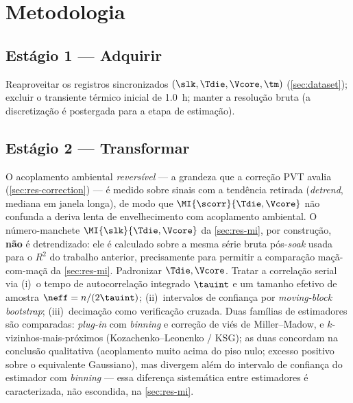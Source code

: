 \section{Metodologia}
\label{sec:methodology}


\subsection{Estágio 1 --- Adquirir}
Reaproveitar os registros sincronizados $(\slk,\Tdie,\Vcore,\tm)$
(\cref{sec:dataset}); excluir o transiente térmico inicial de 1.0~h; manter a
resolução bruta (a discretização é postergada para a etapa de estimação).

\subsection{Estágio 2 --- Transformar}
O acoplamento ambiental \emph{reversível} --- a grandeza que a correção PVT
avalia (\cref{sec:res-correction}) --- é medido sobre sinais com a tendência
retirada (\emph{detrend}, mediana em janela longa), de modo que
$\MI{\scorr}{\Tdie,\Vcore}$ não confunda a deriva lenta de envelhecimento com
acoplamento ambiental. O número-manchete $\MI{\slk}{\Tdie,\Vcore}$ da
\cref{sec:res-mi}, por construção, \textbf{não} é detrendizado: ele é
calculado sobre a mesma série bruta pós-\emph{soak} usada para o $R^2$ do
trabalho anterior, precisamente para permitir a comparação
maçã-com-maçã da \cref{sec:res-mi}. Padronizar $\Tdie,\Vcore$. Tratar a
correlação serial via (i)~o tempo de autocorrelação integrado $\tauint$ e um
tamanho efetivo de amostra $\neff=n/(2\tauint)$; (ii)~intervalos de confiança
por \emph{moving-block bootstrap}; (iii)~decimação como verificação cruzada.
Duas famílias de estimadores são comparadas: \emph{plug-in} com
\emph{binning} e correção de viés de Miller--Madow, e $k$-vizinhos-mais-próximos
(Kozachenko--Leonenko / KSG); as duas concordam na conclusão qualitativa
(acoplamento muito acima do piso nulo; excesso positivo sobre o
equivalente Gaussiano), mas divergem além do intervalo de confiança do
estimador com \emph{binning} --- essa diferença sistemática entre
estimadores é caracterizada, não escondida, na \cref{sec:res-mi}.

